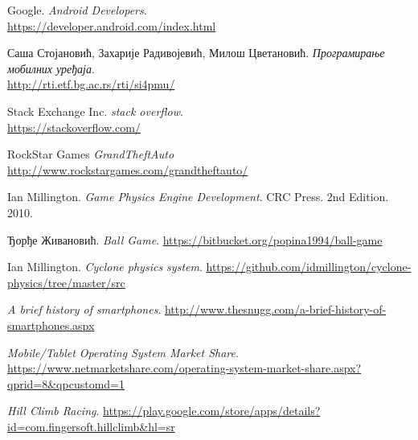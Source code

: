 \begin{thebibliography}{refs}
		Google.
		\emph{Android Developers}.\\
		\url{https://developer.android.com/index.html}

		Саша Стојановић, Захарије Радивојевић, Милош Цветановић.
		\emph{Програмирање мобилних уређаја}.\\
		\url{http://rti.etf.bg.ac.rs/rti/si4pmu/}

		Stack Exchange Inc.
		\emph{stack overflow}.\\
		\url{https://stackoverflow.com/}

		RockStar Games
		\emph{GrandTheftAuto}
		\url{http://www.rockstargames.com/grandtheftauto/}

		Ian Millington.
		\emph{Game Physics Engine Development}.
		CRC Press.
		2nd Edition. 2010.

		Ђорђе Живановић.
		\emph{Ball Game}.
		\url{https://bitbucket.org/popina1994/ball-game}


		Ian Millington.
		\emph{Cyclone physics system}.
		\url{https://github.com/idmillington/cyclone-physics/tree/master/src}

		\emph{A brief history of smartphones}.
		\url{http://www.thesnugg.com/a-brief-history-of-smartphones.aspx}

		\emph{Mobile/Tablet Operating System Market Share}.
		\url{https://www.netmarketshare.com/operating-system-market-share.aspx?qprid=8&qpcustomd=1}

		\emph{Hill Climb Racing}.
		\url{https://play.google.com/store/apps/details?id=com.fingersoft.hillclimb&hl=sr}







\end{thebibliography}
